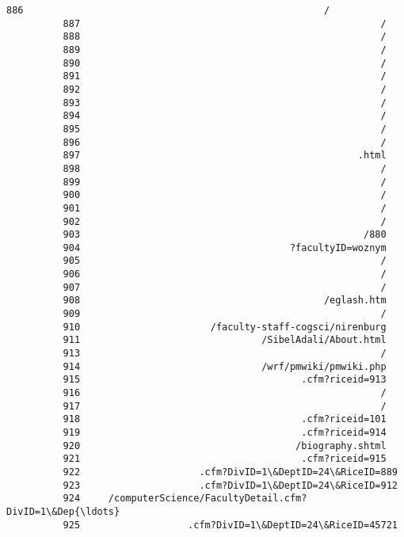 \documentclass[11pt]{article}
\begin{document}
\begin{Verbatim}[commandchars=\\\{\}]
          886                                                     /
          887                                                     /
          888                                                     /
          889                                                     /
          890                                                     /
          891                                                     /
          892                                                     /
          893                                                     /
          894                                                     /
          895                                                     /
          896                                                     /
          897                                                 .html
          898                                                     /
          899                                                     /
          900                                                     /
          901                                                     /
          902                                                     /
          903                                                  /880
          904                                     ?facultyID=woznym
          905                                                     /
          906                                                     /
          907                                                     /
          908                                           /eglash.htm
          909                                                     /
          910                       /faculty-staff-cogsci/nirenburg
          911                                /SibelAdali/About.html
          913                                                     /
          914                                /wrf/pmwiki/pmwiki.php
          915                                       .cfm?riceid=913
          916                                                     /
          917                                                     /
          918                                       .cfm?riceid=101
          919                                       .cfm?riceid=914
          920                                      /biography.shtml
          921                                       .cfm?riceid=915
          922                     .cfm?DivID=1\&DeptID=24\&RiceID=889
          923                     .cfm?DivID=1\&DeptID=24\&RiceID=912
          924     /computerScience/FacultyDetail.cfm?DivID=1\&Dep{\ldots}
          925                   .cfm?DivID=1\&DeptID=24\&RiceID=45721

\end{Verbatim}
\end{document}
